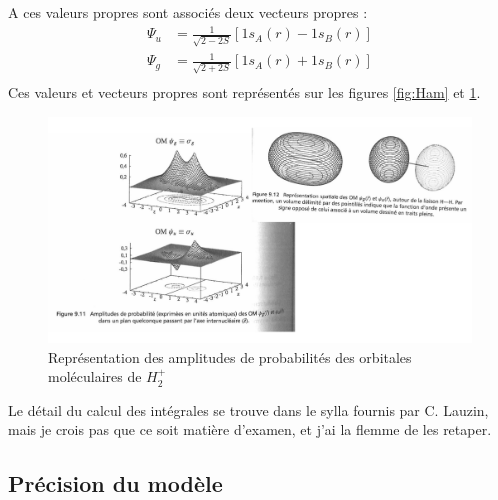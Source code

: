 \newline
A ces valeurs propres sont associés deux vecteurs propres :
\begin{equation*}
\begin{split}
    \Psi_u &= \frac{1}{\sqrt{2-2S}}[1s_A(r)-1s_B(r)]\\
    \Psi_g &= \frac{1}{\sqrt{2+2S}}[1s_A(r)+1s_B(r)]\\   
\end{split}
\end{equation*}
Ces valeurs et vecteurs propres sont représentés sur les figures \ref{fig:Ham} et \ref{fig:Amp}.\newline
\begin{figure}[ht]
    \centering
    \includegraphics[scale = 0.65]{Images3/LCAOAmplitudes.PNG}
    \caption{Représentation des amplitudes de probabilités des orbitales
moléculaires de $H_2^+$}
    \label{fig:Amp}
\end{figure}
Le détail du calcul des intégrales se trouve dans le sylla fournis par C. Lauzin, mais je crois pas que ce soit matière d'examen, et j'ai la flemme de les retaper.

\subsection{Précision du modèle}


